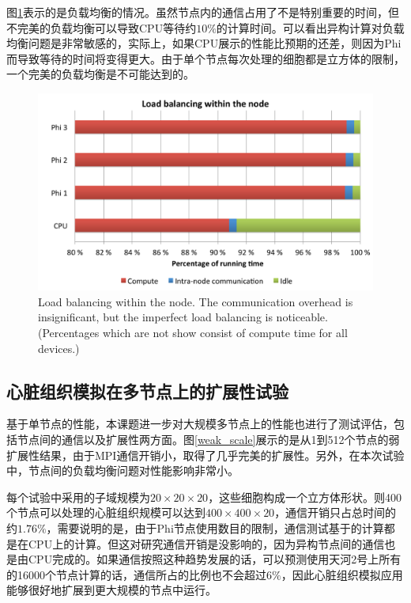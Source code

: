 图\ref{loadbalance}表示的是负载均衡的情况。虽然节点内的通信占用了不是特别重要的时间，但不完美的负载均衡可以导致CPU等待约$10\%$的计算时间。可以看出异构计算对负载均衡问题是非常敏感的，实际上，如果CPU展示的性能比预期的还差，则因为Phi而导致等待的时间将变得更大。由于单个节点每次处理的细胞都是立方体的限制，一个完美的负载均衡是不可能达到的。

\begin{figure}
 \includegraphics[width=\linewidth]{figs/loadbalance.pdf}
  \caption{Load balancing within the node. The communication overhead is insignificant, but the imperfect load balancing is noticeable. (Percentages which are not show consist of compute time for all devices.)}
  \label{loadbalance}
\end{figure}

\subsection{心脏组织模拟在多节点上的扩展性试验}
基于单节点的性能，本课题进一步对大规模多节点上的性能也进行了测试评估，包括节点间的通信以及扩展性两方面。图\ref{weak_scale}展示的是从1到512个节点的弱扩展性结果，由于MPI通信开销小，取得了几乎完美的扩展性。另外，在本次试验中，节点间的负载均衡问题对性能影响非常小。

每个试验中采用的子域规模为$20\times20\times20$，这些细胞构成一个立方体形状。则400个节点可以处理的心脏组织规模可以达到$400\times400\times20$，通信开销只占总时间的约$1.76\%$，需要说明的是，由于Phi节点使用数目的限制，通信测试基于的计算都是在CPU上的计算。但这对研究通信开销是没影响的，因为异构节点间的通信也是由CPU完成的。如果通信按照这种趋势发展的话，可以预测使用天河2号上所有的16000个节点计算的话，通信所占的比例也不会超过$6\%$，因此心脏组织模拟应用能够很好地扩展到更大规模的节点中运行。

